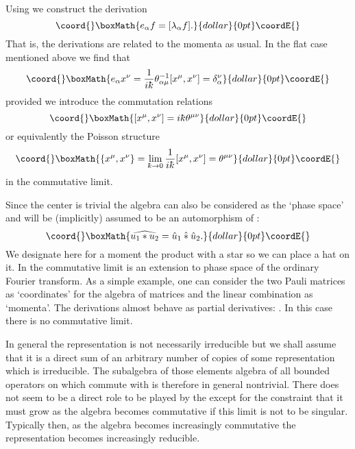 \documentclass[12pt,a4paper]{article}
\def\ad{\mbox{ad}\,}
\def\c#1{{\cal #1}}
\def\kbar{{\mathchar'26\mkern-9muk}}
\def\wm{\mathbin{*}}
\def\hwm{\mathbin{\hat *}}
\begin{document}
Using \myHighlight{$\lambda_\alpha$}\coordHE{} we construct the derivation
$$\coord{}\boxMath{
e_\alpha f = [\lambda_\alpha f].
}{dollar}{0pt}\coordE{}$$
That is, the derivations are related to the momenta as
usual.  In the flat case mentioned above we find that
$$\coord{}\boxMath{
e_\alpha x^\nu = 
\frac{1}{i\kbar}\theta^{-1}_{\alpha\mu} [x^\mu, x^\nu] = \delta_\alpha^\nu
}{dollar}{0pt}\coordE{}$$
provided we introduce the commutation relations
$$\coord{}\boxMath{
[x^\mu, x^\nu] = i\kbar \theta^{\mu\nu}
}{dollar}{0pt}\coordE{}$$
or equivalently the Poisson structure 
$$\coord{}\boxMath{
\{x^\mu, x^\nu\} = 
\lim_{\kbar\to 0}\frac 1{i\kbar} [x^\mu, x^\nu] = \theta^{\mu\nu}
}{dollar}{0pt}\coordE{}$$
in the commutative limit.  

Since the center is trivial the algebra can also be considered as the
`phase space' and \coordHE{} will be (implicitly) assumed to be an
automorphism of \myHighlight{$\c{A}$}\coordHE{}:
$$\coord{}\boxMath{
\widehat{u_1 \wm u_2} = \hat u_1 \hwm \hat u_2.
}{dollar}{0pt}\coordE{}$$
We designate here for a moment the product with a star so we can
place a hat on it. In the commutative limit \coordHE{} is an extension to phase
space of the ordinary Fourier transform.  As a simple example, one can
consider the two Pauli matrices \coordHE{} as
`coordinates' for the algebra of \coordHE{} matrices and the linear
combination 
\coordHE{} 
as `momenta'. The derivations \myHighlight{$e_\alpha = \ad \lambda_\alpha$}\coordHE{} almost
behave as partial derivatives: \coordHE{}. 
In this case there is no commutative limit.

In general the representation is not necessarily irreducible but we
shall assume that it is a direct sum of an arbitrary number of copies
of some representation which is irreducible.  The subalgebra
\myHighlight{$\c{A}^\prime_\rho$}\coordHE{} of those elements algebra \myHighlight{$\c{B}(\c{H})$}\coordHE{} of all
bounded operators on \myHighlight{$\c{H}$}\coordHE{} which commute with \myHighlight{$\c{A}_\rho$}\coordHE{} is
therefore in general nontrivial.  There does not seem to be a direct
role to be played by the \myHighlight{$\c{A}^\prime_\rho$}\coordHE{} except for the constraint
that it must grow as the algebra becomes commutative if this limit is
not to be singular.  Typically then, as the algebra becomes
increasingly commutative the representation becomes increasingly
reducible.
\end{document}
